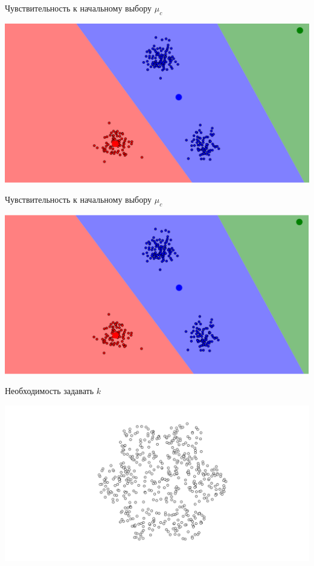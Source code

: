 \documentclass[10pt]{beamer}
\begin{document}
\begin{frame}{Чувствительность к начальному выбору $\mu_c$}
	\begin{center}
	  \includegraphics[width= \textwidth, keepaspectratio = true]{images/localmin3}  
	\end{center}
\end{frame}

\begin{frame}{Чувствительность к начальному выбору $\mu_c$}
	\begin{center}
	  \includegraphics[width= \textwidth, keepaspectratio = true]{images/localmin4}  
	\end{center}
\end{frame}

\begin{frame}{Необходимость задавать $k$}
	\begin{center}
	  \includegraphics[width= \textwidth, keepaspectratio = true]{images/k_means_k}  
	\end{center}
\end{frame}
\end{document}
